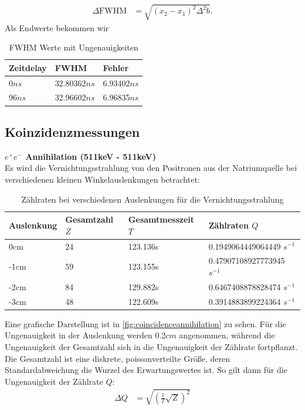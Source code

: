 \documentclass[%
aps,
onecolumn,
11pt,
tightenlines,
nofootinbib,
superscriptaddress,
floatfix,
prd,
]{revtex4-2}
\begin{document}
\begin{align}
	\Delta \text{FWHM} &= \sqrt{ (x_2 - x_1)^2\Delta^2 b }.
\end{align}
Als Endwerte bekommen wir
\begin{table}[H]
	\centering
	\begin{tabular}{lll}
		\toprule
			Zeitdelay & FWHM         & Fehler \\
		\midrule
			0$ns$     & 32.80362$ns$ & 6.93402$ns$ \\
		\cline{1-3}
			96$ns$    & 32.96602$ns$ & 6.96835$ns$ \\
		\cline{1-3}
		\bottomrule
	\end{tabular}
	\caption{FWHM Werte mit Ungenauigkeiten}
	\label{tab:fwhm}
\end{table}

\newpage
\subsection{Koinzidenzmessungen}
\noindent \textbf{$e^+e^-$ Annihilation (511keV - 511keV)}\\
	Es wird die Vernichtungsstrahlung von den Positronen aus der Natriumquelle bei verschiedenen kleinen Winkelauslenkungen betrachtet:

\begin{table}[H]
    \centering
    \begin{tabular}{llll}
    \hline
        Auslenkung & Gesamtzahl $Z$ & Gesamtmesszeit $T$ & Zählraten $Q$\\ \hline
        0cm & 24 & 123.136s & 0.1949064449064449 $s^{-1}$ \\ \hline
        -1cm & 59 & 123.155s & 0.47907108927773945 $s^{-1}$ \\ \hline
        -2cm & 84 & 129.882s & 0.6467408878828474 $s^{-1}$ \\ \hline
        -3cm & 48 & 122.609s & 0.3914883899224364 $s^{-1}$ \\ \hline
    \end{tabular}
	\caption{Zählraten bei verschiedenen Auslenkungen für die Vernichtungsstrahlung}
	\label{tab:coincidenceannihilation}
\end{table}

Eine grafische Darstellung ist in \ref{fig:coincidenceannihilation} zu sehen. Für die Ungenauigkeit in der Auslenkung werden 0.2$cm$ angenommen, während die Ungenauigkeit der Gesamtzahl sich in die Ungenauigkeit der Zählrate fortpflanzt. Die Gesamtzahl ist eine diskrete, poissonverteilte Größe, deren Standardabweichung die Wurzel des Erwartungswertes ist. So gilt dann für die Ungenauigkeit der Zählrate $Q$:
\begin{align}
	\Delta Q &= \sqrt{ \left( \frac{1}{T}\sqrt{Z}  \right)^2  }
\end{align}
\end{document}
